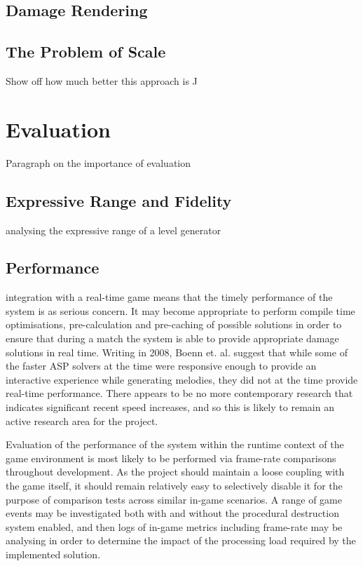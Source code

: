 \documentclass[11pt]{report}
\begin{document}
	\section{Damage Rendering}

	\section{The Problem of Scale}
		Show off how much better this approach is ^^

\chapter{Evaluation}
	Paragraph on the importance of evaluation

	\section{Expressive Range and Fidelity}
		\cite{smith2010analyzing} analysing the expressive range of a level generator

	\section{Performance}
		integration with a real-time game means that the timely performance of the system is as serious concern. It may become appropriate to perform compile time optimisations, pre-calculation and pre-caching of possible solutions in order to ensure that during a match the system is able to provide appropriate damage solutions in real time. 
		Writing in 2008, Boenn et. al. \cite{boenn2008automatic} suggest that while some of the faster ASP solvers at the time were responsive enough to provide an interactive experience while generating melodies, they did not at the time provide real-time performance. There appears to be no more contemporary research that indicates significant recent speed increases, and so this is likely to remain an active research area for the project.

		Evaluation of the performance of the system within the runtime context of the game environment is most likely to be performed via frame-rate comparisons throughout development. As the project should maintain a loose coupling with the game itself, it should remain relatively easy to selectively disable it for the purpose of comparison tests across similar in-game scenarios. A range of game events may be investigated both with and without the procedural destruction system enabled, and then logs of in-game metrics including frame-rate may be analysing in order to determine the impact of the processing load required by the implemented solution.
\end{document}

